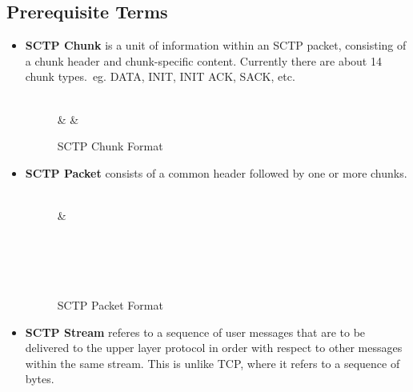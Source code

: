 \documentclass[a4paper,11pt]{article}
\begin{document}
\subsection{Prerequisite Terms}
\begin{itemize}
\item \textbf{SCTP Chunk} is a unit of information within an SCTP packet,
consisting of a chunk header and chunk-specific content. Currently there
are about 14 chunk types.\ eg. DATA, INIT, INIT ACK, SACK, etc.

\begin{figure}[h]
	\centering
	\begin{bytefield}[bitwidth=1.1em]{32}
	\\
	 &  & \\
	\end{bytefield}
	\caption{SCTP Chunk Format}
\end{figure}

\item \textbf{SCTP Packet} consists of a common header followed by one or
	more chunks.
\begin{figure}[h]
	\centering
	\begin{bytefield}[bitwidth=1.1em]{32}
	\\
	 & \\
	\\
	\\
	\\
	\\
	\end{bytefield}
	\caption{SCTP Packet Format}
\end{figure}

\item \textbf{SCTP Stream} referes to a sequence of user messages that are to be
	delivered to the upper layer protocol in order with respect to other
	messages within the same stream. This is unlike TCP, where it refers
	to a sequence of bytes.
\end{itemize}


\clearpage
\end{document}

